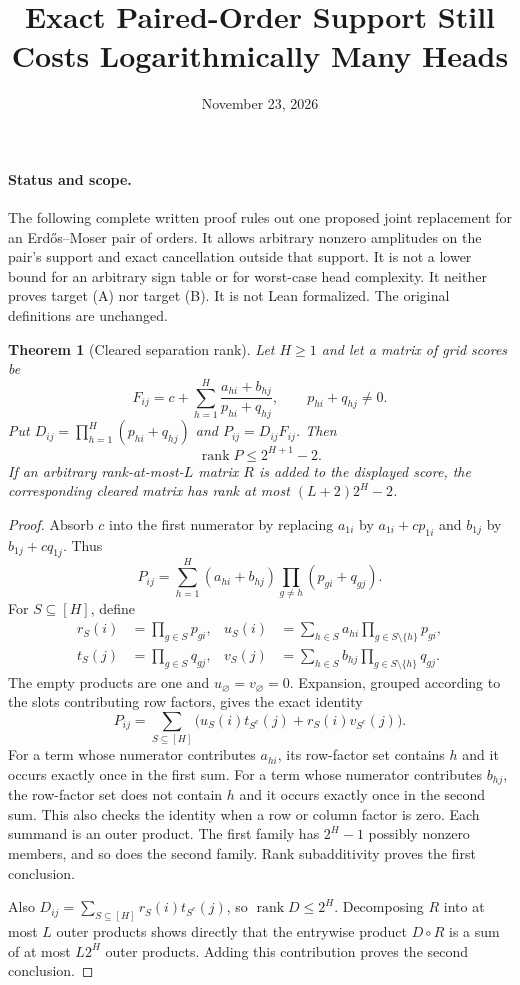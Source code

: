 \documentclass[11pt]{article}
\newtheorem{theorem}{Theorem}
\begin{document}
\title{Exact Paired-Order Support Still Costs Logarithmically Many Heads}
\author{}
\date{November 23, 2026}
\maketitle

\paragraph{Status and scope.}
The following complete written proof rules out one proposed joint
replacement for an Erd\H{o}s--Moser pair of orders. It allows arbitrary
nonzero amplitudes on the pair's support and exact cancellation outside
that support. It is not a lower bound for an arbitrary sign table or for
worst-case head complexity. It neither proves target (A) nor target (B).
It is not Lean formalized. The original definitions are unchanged.

\begin{theorem}[Cleared separation rank]
Let $H\geq1$ and let a matrix of grid scores be
\[
 F_{ij}=c+\sum_{h=1}^H
       \frac{a_{hi}+b_{hj}}{p_{hi}+q_{hj}},
 \qquad p_{hi}+q_{hj}\ne0.
\]
Put $D_{ij}=\prod_{h=1}^H(p_{hi}+q_{hj})$ and $P_{ij}=D_{ij}F_{ij}$.
Then
\[
 \operatorname{rank}P\leq 2^{H+1}-2.
\]
If an arbitrary rank-at-most-$L$ matrix $R$ is added to the displayed
score, the corresponding cleared matrix has rank at most
$(L+2)2^H-2$.
\end{theorem}
\begin{proof}
Absorb $c$ into the first numerator by replacing
$a_{1i}$ by $a_{1i}+cp_{1i}$ and
$b_{1j}$ by $b_{1j}+cq_{1j}$. Thus
\[
 P_{ij}=\sum_{h=1}^H (a_{hi}+b_{hj})
                         \prod_{g\ne h}(p_{gi}+q_{gj}).
\]
For $S\subseteq[H]$, define
\[
 \begin{split}
 r_S(i)&=\prod_{g\in S}p_{gi},&
 u_S(i)&=\sum_{h\in S}a_{hi}\prod_{g\in S\setminus\{h\}}p_{gi},\\
 t_S(j)&=\prod_{g\in S}q_{gj},&
 v_S(j)&=\sum_{h\in S}b_{hj}\prod_{g\in S\setminus\{h\}}q_{gj}.
 \end{split}
\]
The empty products are one and $u_\varnothing=v_\varnothing=0$.
Expansion, grouped according to the slots contributing row factors,
gives the exact identity
\[
 P_{ij}=\sum_{S\subseteq[H]}
       \bigl(u_S(i)t_{S^c}(j)+r_S(i)v_{S^c}(j)\bigr).
\]
For a term whose numerator contributes $a_{hi}$, its row-factor set
contains $h$ and it occurs exactly once in the first sum. For a term
whose numerator contributes $b_{hj}$, the row-factor set does not
contain $h$ and it occurs exactly once in the second sum. This also
checks the identity when a row or column factor is zero.
Each summand is an outer product. The first family has $2^H-1$
possibly nonzero members, and so does the second family. Rank
subadditivity proves the first conclusion.

Also $D_{ij}=\sum_{S\subseteq[H]}r_S(i)t_{S^c}(j)$, so
$\operatorname{rank}D\leq2^H$. Decomposing $R$ into at most $L$
outer products shows directly that the entrywise product $D\circ R$
is a sum of at most $L2^H$ outer products. Adding this contribution
proves the second conclusion.
\end{proof}
\end{document}
